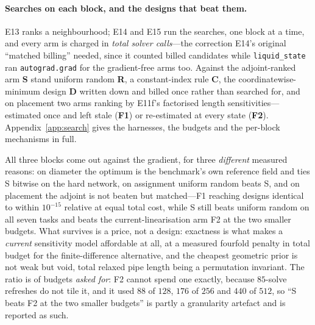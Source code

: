\documentclass{article}
\begin{document}
\paragraph{Searches on each block, and the designs that beat them.}
E13 ranks a neighbourhood; E14 and E15 run the searches, one block at a time, and every arm is
charged in \emph{total solver calls}---the correction E14's original ``matched billing'' needed,
since it counted billed candidates while \texttt{liquid\_state} ran \texttt{autograd.grad} for
the gradient-free arms too.  Against the adjoint-ranked arm \textbf{S} stand uniform random
\textbf{R}, a constant-index rule \textbf{C}, the coordinatewise-minimum design \textbf{D}
written down and billed once rather than searched for, and on placement two arms ranking by
E11f's factorised length sensitivities---estimated once and left stale (\textbf{F1}) or
re-estimated at every state (\textbf{F2}).  Appendix~\ref{app:search} gives the harnesses, the
budgets and the per-block mechanisms in full.

All three blocks come out against the gradient, for three \emph{different} measured reasons: on
diameter the optimum is the benchmark's own reference field and ties S bitwise on the hard
network, on assignment uniform random beats S, and on placement the adjoint is not beaten but
matched---F1 reaching designs identical to within $10^{-15}$ relative at equal total cost, while
S still beats uniform random on all seven tasks and beats the current-linearisation arm F2 at the
two smaller budgets.  What survives is a price, not a design: exactness is what makes a
\emph{current} sensitivity model affordable at all, at a measured fourfold penalty in total
budget for the finite-difference alternative, and the cheapest geometric prior is not weak but
void, total relaxed pipe length being a permutation invariant.  The ratio is of budgets
\emph{asked for}: F2 cannot spend one exactly, because $85$-solve refreshes do not tile it, and it
used $88$ of $128$, $176$ of $256$ and $440$ of $512$, so ``S beats F2 at the two smaller budgets''
is partly a granularity artefact and is reported as such.
\end{document}
